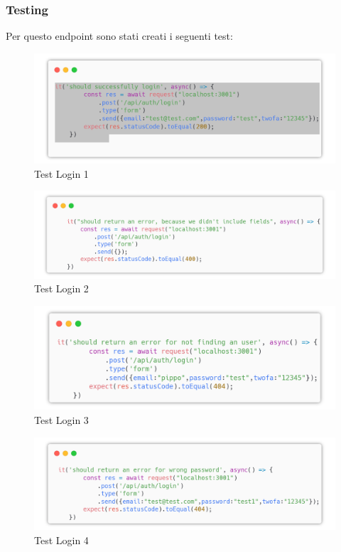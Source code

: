 \documentclass{report}
\begin{document}
\subsubsection*{Testing}
Per questo endpoint sono stati creati i seguenti test:
\begin{figure}[H]
	\centering\includegraphics[width=1\textwidth]{images/microservizio-autenticazione/tests/login_test_1.png}
	\caption{Test Login 1}
\end{figure}
\begin{figure}[H]
	\centering\includegraphics[width=1\textwidth]{images/microservizio-autenticazione/tests/login_test_2.png}
	\caption{Test Login 2}
\end{figure}
\begin{figure}[H]
	\centering\includegraphics[width=1\textwidth]{images/microservizio-autenticazione/tests/login_test_3.png}
	\caption{Test Login 3}
\end{figure}
\begin{figure}[H]
	\centering\includegraphics[width=1\textwidth]{images/microservizio-autenticazione/tests/login_test_4.png}
	\caption{Test Login 4}
\end{figure}
\end{document}

